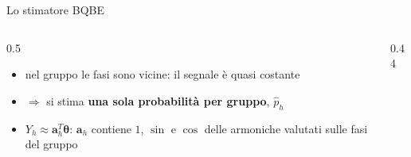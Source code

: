 \documentclass[aspectratio=169,9pt]{beamer}
\begin{document}
\begin{frame}{Lo stimatore BQBE}
  \begin{columns}[T]
    \begin{column}{0.5\textwidth}
      \footnotesize
      \begin{itemize}
        \item nel gruppo le fasi sono vicine: il segnale è quasi costante
        \item[] $\Rightarrow$ si stima \textbf{una sola probabilità per gruppo}, $\hat p_h$
        \item $Y_h \approx \bm a_h^{T}\bm\theta$: $\bm a_h$ contiene $1$, $\sin$ e $\cos$
              delle armoniche valutati sulle fasi del gruppo
      \end{itemize}
    \end{column}
    \begin{column}{0.44\textwidth}
    \end{column}
  \end{columns}
\end{frame}
\end{document}
